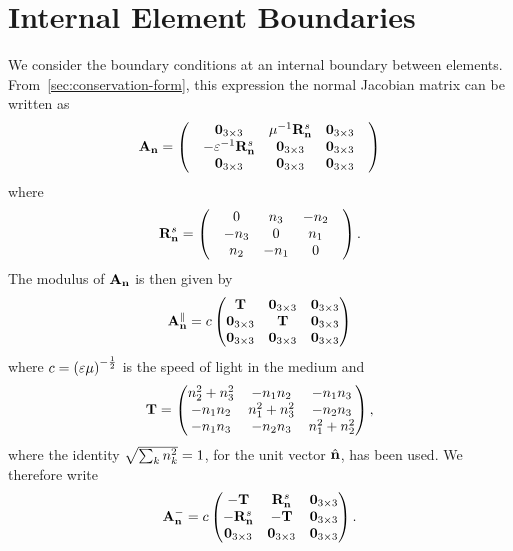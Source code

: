 \section{Internal Element Boundaries}
We consider the boundary conditions at an internal boundary between elements.
From~\ref{sec:conservation-form}, this expression the normal Jacobian matrix can
be written as
$$
  \mathbf{A}_\mathbf{n} =
  \begin{pmatrix}
 & \mathbf{0}_{3\times3}  & \mu^{-1} \mathbf{R}^{s}_{\mathbf{n}} & \mathbf{0}_{3\times3} \\
 & - \varepsilon^{-1} \mathbf{R}^{s}_{\mathbf{n}} & \mathbf{0}_{3\times3} & \mathbf{0}_{3\times3} \\
 & \mathbf{0}_{3\times3} & \mathbf{0}_{3\times3} & \mathbf{0}_{3\times3} 
 & \end{pmatrix} 
$$
where
$$
  \mathbf{R}^{s}_{\mathbf{n}} =
  \begin{pmatrix}
 & 0 & n_3 & -n_2 \\
 & -n_3 & 0 & n_1 \\
& n_2 & -n_1 & 0 
 & \end{pmatrix} .
$$
The modulus of $\mathbf{A}_\mathbf{n}$ is then given by
\begin{align*}
\mathbf{A}_\mathbf{n}^{\parallel} = c
\begin{pmatrix}
  \mathbf{T} & \mathbf{0}_{3\times3} & \mathbf{0}_{3\times3} \\
  \mathbf{0}_{3\times3}  & \mathbf{T} & \mathbf{0}_{3\times3} \\
   \mathbf{0}_{3\times3} & \mathbf{0}_{3\times3} & \mathbf{0}_{3\times3} 
\end{pmatrix}
\end{align*}
where $c = \left( \varepsilon \mu  \right)^{-\frac{1}{2}}$ is the speed of light in the medium and
\begin{align*}
  \mathbf{T} = 
\begin{pmatrix}
n_2^2 + n_3^2 &      -n_1 n_2 &      -n_1 n_3 \\
-n_1 n_2 & n_1^2 + n_3^2 &      -n_2 n_3 \\
-n_1 n_3 &      -n_2 n_3 & n_1^2 + n_2^2 \\
\end{pmatrix} ,
\end{align*}
where the identity $\sqrt{\sum_{k} n_{k}^2} = 1$, for the unit vector $\hat{\mathbf{n}}$, has been used. We therefore write
\begin{align*}
\mathbf{A}_\mathbf{n}^{-} = c
\begin{pmatrix}
  -\mathbf{T} & \mathbf{R}^{s}_{\mathbf{n}} & \mathbf{0}_{3\times3} \\
  -\mathbf{R}^{s}_{\mathbf{n}}  & -\mathbf{T} & \mathbf{0}_{3\times3} \\
   \mathbf{0}_{3\times3} & \mathbf{0}_{3\times3} & \mathbf{0}_{3\times3} 
\end{pmatrix} .
\end{align*}

